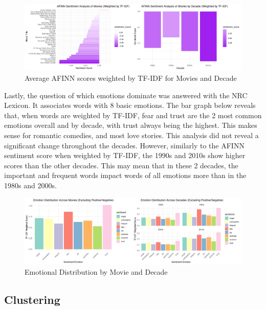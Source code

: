 \documentclass[
  authoryear,
  preprint]{elsarticle}
\begin{document}
\begin{figure}[H]

{\centering \includegraphics{images/decavgtdfif-imageonline.co-merged.png}

}

\caption{Average AFINN scores weighted by TF-IDF for Movies and Decade}

\end{figure}%

Lastly, the question of which emotions dominate was answered with the
NRC Lexicon. It associates words with 8 basic emotions. The bar graph
below reveals that, when words are weighted by TF-IDF, fear and trust
are the 2 most common emotions overall and by decade, with trust always
being the highest. This makes sense for romantic comedies, and most love
stories. This analysis did not reveal a significant change throughout
the decades. However, similarly to the AFINN sentiment score when
weighted by TF-IDF, the 1990s and 2010s show higher scores than the
other decades. This may mean that in these 2 decades, the important and
frequent words impact words of all emotions more than in the 1980s and
2000s.

\begin{figure}[H]

{\centering \includegraphics{images/nrc2-imageonline.co-merged.png}

}

\caption{Emotional Distribution by Movie and Decade}

\end{figure}%

\subsection{Clustering}\label{clustering}
\end{document}
